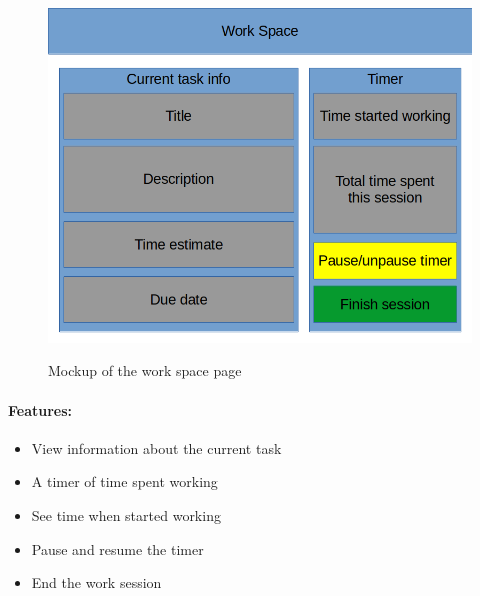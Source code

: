 \documentclass{article}
\begin{document}
\begin{minipage}{0.5\textwidth}
	\begin{figure}[H]
		\includegraphics[width=\linewidth]{Mockups/study_space.png}
		\label{fig:work_space_mockup}
		\caption{Mockup of the work space page}
	\end{figure}
\end{minipage} \hfill
\begin{minipage}{0.45\textwidth}
	\paragraph{Features:}
	\begin{itemize}
		\item View information about the current task
		\item A timer of time spent working
		\item See time when started working
		\item Pause and resume the timer
		\item End the work session
	\end{itemize}
\end{minipage}
\end{document}
